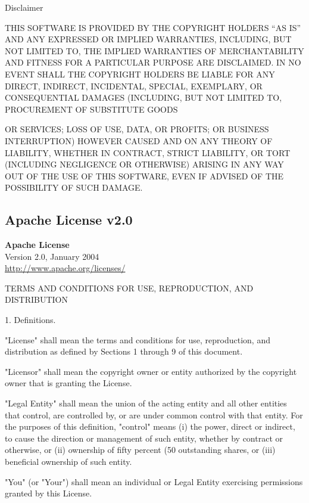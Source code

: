 \documentclass[10pt]{article}
\begin{document}
Disclaimer

THIS SOFTWARE IS PROVIDED BY THE COPYRIGHT HOLDERS “AS IS” AND ANY
EXPRESSED OR IMPLIED WARRANTIES, INCLUDING, BUT NOT LIMITED TO, THE
IMPLIED WARRANTIES OF MERCHANTABILITY AND FITNESS FOR A PARTICULAR
PURPOSE ARE DISCLAIMED. IN NO EVENT SHALL THE COPYRIGHT HOLDERS BE LIABLE
FOR ANY DIRECT, INDIRECT, INCIDENTAL, SPECIAL, EXEMPLARY, OR CONSEQUENTIAL
DAMAGES (INCLUDING, BUT NOT LIMITED TO, PROCUREMENT OF SUBSTITUTE GOODS

OR SERVICES; LOSS OF USE, DATA, OR PROFITS; OR BUSINESS INTERRUPTION)
HOWEVER CAUSED AND ON ANY THEORY OF LIABILITY, WHETHER IN CONTRACT,
STRICT LIABILITY, OR TORT (INCLUDING NEGLIGENCE OR OTHERWISE) ARISING IN
ANY WAY OUT OF THE USE OF THIS SOFTWARE, EVEN IF ADVISED OF THE POSSIBILITY
OF SUCH DAMAGE.

\clearpage
\subsection{Apache License v2.0}
\begin{center}
{\parindent 0in
\textbf{Apache License}\\
Version 2.0, January 2004 \\

\url{http://www.apache.org/licenses/}
}
\end{center}

   TERMS AND CONDITIONS FOR USE, REPRODUCTION, AND DISTRIBUTION

   1. Definitions.

      "License" shall mean the terms and conditions for use, reproduction,
      and distribution as defined by Sections 1 through 9 of this document.

      "Licensor" shall mean the copyright owner or entity authorized by
      the copyright owner that is granting the License.

      "Legal Entity" shall mean the union of the acting entity and all
      other entities that control, are controlled by, or are under common
      control with that entity. For the purposes of this definition,
      "control" means (i) the power, direct or indirect, to cause the
      direction or management of such entity, whether by contract or
      otherwise, or (ii) ownership of fifty percent (50%
      outstanding shares, or (iii) beneficial ownership of such entity.

      "You" (or "Your") shall mean an individual or Legal Entity
      exercising permissions granted by this License.
\end{document}
